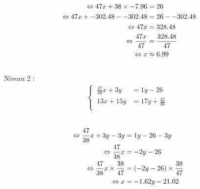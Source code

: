 \documentclass{article}%
\begin{document}
\ \\%
\vspace{5mm}%
\newline%
\begin{align*}%
\ \Leftrightarrow  47x + 38 \times -7.96 &= 26 \\%
\vspace{5mm}%
\newline%
\ \Leftrightarrow  47x + -302.48 --302.48 &= 26 - -302.48 \\%
\vspace{5mm}%
\newline%
\ \Leftrightarrow  47x  &= 328.48 \\%
\vspace{5mm}%
\newline%
\ \Leftrightarrow  \frac{47x}{47} &= \frac{328.48}{47}\\%
\vspace{5mm}%
\newline%
\ \Leftrightarrow  x &\approx 6.99 \\%
\vspace{5mm}%
\newline%
\end{align*}%
Niveau 2 :%
\begin{align*}%
\begin{cases}%
\  \frac{47}{38}x + 3y &= 1y - 26 \\%
\  13x + 15y &= 17y + \frac{42}{48} \\%
\end{cases}%
\\%
\end{align*}%
\ \\%
\vspace{5mm}%
\newline%
\begin{align*}%
\  \Leftrightarrow  \frac{47}{38}x + 3y - 3y &= 1y - 26 - 3y \\%
\vspace{5mm}%
\newline%
\  \Leftrightarrow  \frac{47}{38}x &= -2y - 26 \\%
\vspace{5mm}%
\newline%
\  \Leftrightarrow  \frac{47}{38}x \times \frac{38}{47} &= (-2y - 26) \times \frac{38}{47} \\%
\vspace{5mm}%
\newline%
\  \Leftrightarrow  x &= -1.62y - 21.02\\%
\vspace{5mm}%
\newline%
\end{align*}%
\end{document}
